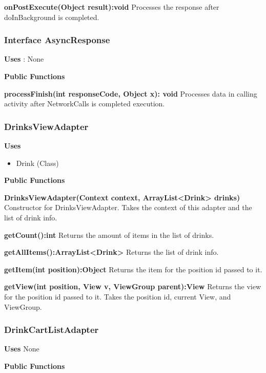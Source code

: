 \documentclass [10pt]{article}
\begin{document}
\textbf{onPostExecute(Object result):void}
Processes the response after doInBackground is completed.

\subsubsection{Interface AsyncResponse}
\textbf{Uses} : None

\textbf{Public Functions}

\textbf{processFinish(int responseCode, Object x): void}
Processes data in calling activity after NetworkCalls is completed execution.


\subsubsection{DrinksViewAdapter}

\textbf{Uses}
\begin{itemize}
	\item Drink (Class)
\end{itemize}

\textbf{Public Functions}

\textbf{DrinksViewAdapter(Context context, ArrayList<Drink> drinks)}
Constructor for DrinksViewAdapter. Takes the context of this adapter and the list of drink info.

\textbf{getCount():int}
Returns the amount of items in the list of drinks.

\textbf{getAllItems():ArrayList<Drink>}
Returns the list of drink info.

\textbf{getItem(int position):Object}
Returns the item for the position id passed to it.

\textbf{getView(int position, View v, ViewGroup parent):View}
Returns the view for the position id passed to it. Takes the position id, current View, and ViewGroup.



\subsubsection{DrinkCartListAdapter}

\textbf{Uses} None

\textbf{Public Functions}
\end{document}
